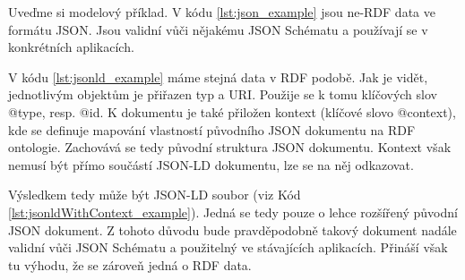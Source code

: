 Uveďme si modelový příklad. V kódu \ref{lst:json_example} jsou ne-RDF data ve formátu JSON. Jsou validní vůči nějakému JSON Schématu a používají se v konkrétních aplikacích.  

V kódu \ref{lst:jsonld_example} máme stejná data v RDF podobě. Jak je vidět, jednotlivým objektům je přiřazen typ a URI. Použije se k tomu klíčových slov @type, resp. @id. K dokumentu je také přiložen kontext (klíčové slovo @context), kde se definuje mapování vlastností původního JSON dokumentu na RDF ontologie. Zachovává se tedy původní struktura JSON dokumentu. Kontext však nemusí být přímo součástí JSON-LD dokumentu, lze se na něj odkazovat. 

Výsledkem tedy může být JSON-LD soubor (viz Kód \ref{lst:jsonldWithContext_example}). Jedná se tedy pouze o lehce rozšířený původní JSON dokument. Z tohoto důvodu bude pravděpodobně takový dokument nadále validní vůči JSON Schématu a použitelný ve stávajících aplikacích. Přináší však tu výhodu, že se zároveň jedná o RDF data.

\newpage





